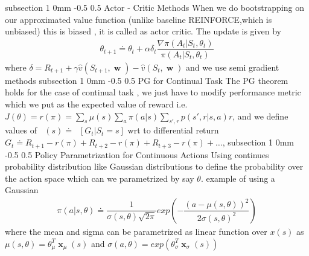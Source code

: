 \documentclass[twocolumn,11pt]{article}
\makeatletter
\DeclareMathOperator{\E}{\mathbb{E}}
\DeclareMathOperator{\w}{\textbf{w}}
\DeclareMathOperator{\vp}{v_\pi} %
\DeclareMathOperator{\Ep}{\E_\pi}
\DeclareMathOperator{\x}{\textbf{x}}
\renewcommand{\subsection}{\@startsection
{subsection}%
{1}%
{0mm}%
{-0.5\baselineskip}%
{0.5\baselineskip}%
{\bfseries\color{blue}}} %
\makeatother
\begin{document}
\subsection{Actor - Critic Methods}
When we do bootstrapping on our approximated value function (unlike baseline REINFORCE,which is unbiased) this is biased , it is called as actor critic. 
The update is given by 
\begin{align*}
\theta_{t+1} \doteq \theta_t + \alpha \delta_t \dfrac{\nabla \pi(A_t   | S_t , \theta_t)  }{\pi (A_t | S_t, \theta_t)}
\end{align*} where $\delta = R_{t+1} + \gamma \hat{v}(S_{t+1} , \w) - \hat{v}(S_t,  \w)$ and we use semi gradient methods
\subsection{PG for Continual Task}
The PG theorem holds for the case of continual task , we just have to modify performance metric  which we put as the expected value of reward i.e. $J(\theta) = r(\pi) = \sum_s \mu(s) \sum_a \pi(a|s) \sum_{s',r} p(s',r|s,a) r$, and we define values of $\vp(s) \doteq \Ep[G_t|S_t = s]$ wrt to differential return
$G_t \doteq R_{t+1} - r(\pi) + R_{t+2} - r(\pi) + R_{t+3} - r(\pi) + \ldots$, 
\subsection{Policy Parametrization for Continuous Actions}
Using continues probability distribution like  Gaussian  distributions to define the probability over the action space which can we parametrized by say $\theta$. example of using a Gaussian
\begin{align*}
\pi( a | s, \theta )\doteq \dfrac{1}{\sigma(s, \theta) \sqrt{2\pi}}exp(- \dfrac{(a - \mu(s, \theta))^2}{2\sigma(s,\theta)^2})
\end{align*}
where the mean and sigma can be parametrized as linear function over $x(s)$ as $\mu(s,\theta) = \theta_\mu^T \x_\mu(s)$ and $\sigma(a, \theta) = exp(\theta_\sigma^T \x_\sigma(s))$
\end{document}
